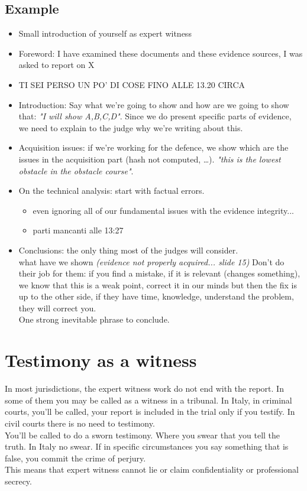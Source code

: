         \subsection{Example}
            \begin{itemize}
                \item Small introduction of yourself as expert witness
                \item Foreword: I have examined these documents and these evidence sources, I was asked to report on X
                \item TI SEI PERSO UN PO' DI COSE FINO ALLE 13.20 CIRCA
                \item Introduction: Say what we're going to show and how are we going to show that: \textit{"I will show A,B,C,D"}. Since we do present specific parts of evidence, we need to explain to the judge why we're writing about this.
                \item Acquisition issues: if we're working for the defence, we show which are the issues in the acquisition part (hash not computed, \dots). \textit{"this is the lowest obstacle in the obstacle course"}.
                \item On the technical analysis: start with factual errors.
                \begin{itemize}
                    \item even ignoring all of our fundamental issues with the evidence integrity...
                    \item parti mancanti alle 13:27
                \end{itemize}
                \item Conclusions: the only thing most of the judges will consider.\\
                    what have we shown \textit{(evidence not properly acquired... slide 15)} 
                    Don't do their job for them: if you find a mistake, if it is relevant (changes something), we know that this is a weak point, correct it in our minds but then the fix is up to the other side, if they have time, knowledge, understand the problem, they will correct you.\\
                    One strong inevitable phrase to conclude.
            \end{itemize}
    \section{Testimony as a witness}
        In most jurisdictions, the expert witness work do not end with the report. In some of them you may be called as a witness in a tribunal. In Italy, in criminal courts, you'll be called, your report is included in the trial only if you testify. In civil courts there is no need to testimony.\\
        You'll be called to do a sworn testimony. Where you swear that you tell the truth. In Italy no swear. If in specific circumstances you say something that is false, you commit the crime of perjury.\\
        This means that expert witness cannot lie or claim confidentiality or professional secrecy.
